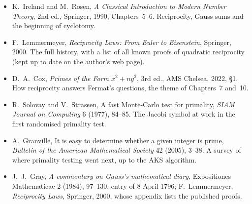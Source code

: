 \begin{itemize}
\item K.~Ireland and M.~Rosen, \emph{A Classical Introduction to Modern Number Theory}, 2nd ed., Springer, 1990, Chapters~5--6. Reciprocity, Gauss sums and the beginning of cyclotomy.
\item F.~Lemmermeyer, \emph{Reciprocity Laws: From Euler to Eisenstein}, Springer, 2000. The full history, with a list of all known proofs of quadratic reciprocity (kept up to date on the author's web page).
\item D.~A.~Cox, \emph{Primes of the Form $x^2+ny^2$}, 3rd ed., AMS Chelsea, 2022, \S1. How reciprocity answers Fermat's questions, the theme of Chapters~7 and~10.
\item R.~Solovay and V.~Strassen, A fast Monte-Carlo test for primality, \emph{SIAM Journal on Computing} 6 (1977), 84--85. The Jacobi symbol at work in the first randomised primality test.
\item A.~Granville, It is easy to determine whether a given integer is prime, \emph{Bulletin of the American Mathematical Society} 42 (2005), 3--38. A survey of where primality testing went next, up to the AKS algorithm.
\item J.~J.~Gray, \emph{A commentary on Gauss's mathematical diary}, Expositiones Mathematicae 2 (1984), 97--130, entry of 8 April 1796; F.~Lemmermeyer, \emph{Reciprocity Laws}, Springer, 2000, whose appendix lists the published proofs.
\end{itemize}
